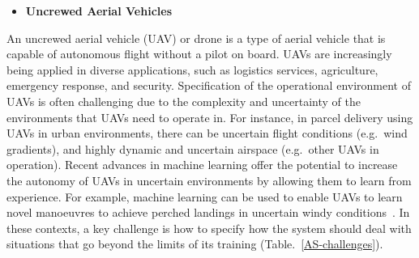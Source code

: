 \documentclass[sigconf,nonacm]{acmart}%
\begin{document}
\begin{itemize}[leftmargin=0.5cm]
	\item \textbf{Uncrewed Aerial Vehicles}
\end{itemize}
An uncrewed aerial vehicle (UAV) or drone is a type of aerial vehicle that is capable of autonomous flight without a pilot on board. UAVs are increasingly being applied in diverse applications, such as logistics services, agriculture, emergency response, and security. Specification of the operational environment of UAVs is often challenging due to the complexity and uncertainty of the environments that UAVs need to operate in. 
For instance, in parcel delivery using UAVs in urban environments, there can be uncertain flight conditions (e.g.\ wind gradients), and highly dynamic and uncertain airspace (e.g.\ other UAVs in operation). 
Recent advances in machine learning offer the potential to increase the autonomy of UAVs in uncertain environments by allowing them to learn from experience. 
For example, machine learning can be used to enable UAVs to learn novel manoeuvres to achieve perched landings in uncertain windy conditions~\cite{Fletcher2021}. 
In these contexts, a key challenge is how to specify how the system should deal with situations that go beyond the limits of its training (Table.~\ref{AS-challenges}).
\end{document}
